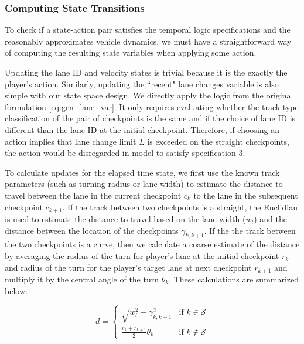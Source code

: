 \subsubsection{Computing State Transitions}
To check if a state-action pair satisfies the temporal logic specifications and the reasonably approximates vehicle dynamics, we must have a straightforward way of computing the resulting state variables when applying some action. 

Updating the lane ID and velocity states is trivial because it is the exactly the player's action. Similarly, updating the ``recent" lane changes variable is also simple with our state space design. We directly apply the logic from the original formulation \eqref{eq:gen_lane_var}. It only requires evaluating whether the track type classification of the pair of checkpoints is the same and if the choice of lane ID is different than the lane ID at the initial checkpoint. Therefore, if choosing an action implies that lane change limit $L$ is exceeded on the straight checkpoints, the action would be disregarded in model to satisfy specification 3. 

To calculate updates for the elapsed time state, we first use the known track parameters (such as turning radius or lane width) to estimate the distance to travel between the lane in the current checkpoint $c_k$ to the lane in the subsequent checkpoint $c_{k+1}$. If the track between two checkpoints is a straight, the Euclidian is used to estimate the distance to travel based on the lane width ($w_l$) and the distance between the location of the checkpoints $\gamma_{k, k+1}$. If the the track between the two checkpoints is a curve, then we calculate a coarse estimate of the distance by averaging the radius of the turn for player's lane at the initial checkpoint $r_k$ and radius of the turn for the player's target lane at next checkpoint $r_{k+1}$ and multiply it by the central angle of the turn $\theta_k$. These calculations are summarized below:

\begin{equation} \label{eq:dist_calc}
    d = \begin{cases}
    \sqrt{w_l^2 + \gamma_{k, k+1}^2} &  \text{if } k \in \mathcal{S} \\
    \frac{r_k + r_{k+1}}{2}\theta_k & \text{if } k \notin \mathcal{S}
    \end{cases}
\end{equation}


